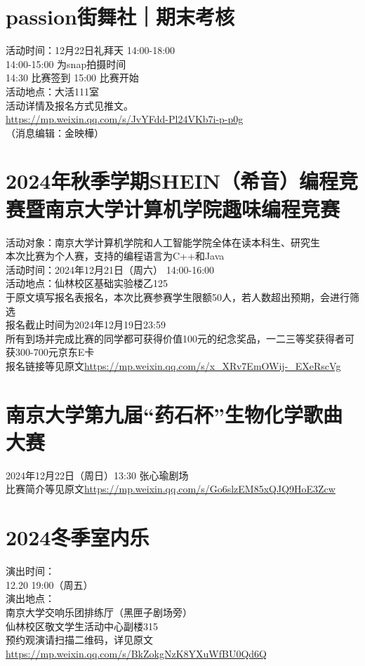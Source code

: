 \documentclass[letterpaper, 12pt]{article}
\begin{document}
\begin{multicols}{2}
\section{passion街舞社｜期末考核}
活动时间：12月22日礼拜天 14:00-18:00\\
14:00-15:00 为snap拍摄时间\\
14:30 比赛签到 15:00 比赛开始\\
活动地点：大活111室\\
活动详情及报名方式见推文。\\
\url{https://mp.weixin.qq.com/s/JvYFdd-Pl24VKb7i-p-p0g}\\
（消息编辑：金映樺）

\section{2024年秋季学期SHEIN（希音）编程竞赛暨南京大学计算机学院趣味编程竞赛}
活动对象：南京大学计算机学院和人工智能学院全体在读本科生、研究生\\
本次比赛为个人赛，支持的编程语言为C++和Java\\
活动时间：2024年12月21日（周六） 14:00-16:00\\
活动地点：仙林校区基础实验楼乙125\\
于原文填写报名表报名，本次比赛参赛学生限额50人，若人数超出预期，会进行筛选\\
报名截止时间为2024年12月19日23:59\\
所有到场并完成比赛的同学都可获得价值100元的纪念奖品，一二三等奖获得者可获300-700元京东E卡\\
报名链接等见原文\url{https://mp.weixin.qq.com/s/x_XRv7EmOWij-_EXeRscVg}\\

\section{南京大学第九届“药石杯”生物化学歌曲大赛}
2024年12月22日（周日）13:30 张心瑜剧场\\
比赛简介等见原文\url{https://mp.weixin.qq.com/s/Go6slzEM85xQJQ9HoE3Zcw}

\section{2024冬季室内乐}
演出时间：\\
12.20 19:00（周五）\\
演出地点：\\
南京大学交响乐团排练厅（黑匣子剧场旁）\\
仙林校区敬文学生活动中心副楼315\\
预约观演请扫描二维码，详见原文\url{https://mp.weixin.qq.com/s/BkZokgNzK8YXuWfBU0Qd6Q}


\end{multicols} 
\end{document}

